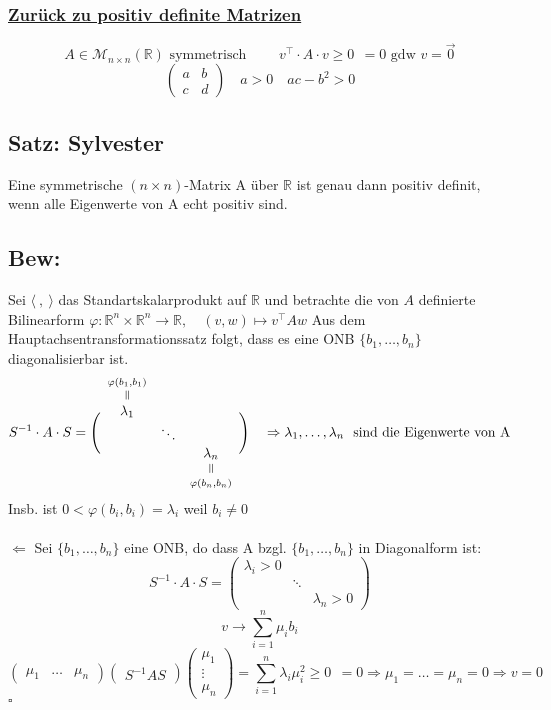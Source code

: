 \documentclass[titlepage,12pt,a4paper,ngerman]{report}
\newenvironment{bew}{\subsection{Bew:}}{\hfill$\square$}
\newcommand{\Bew}[1]{\begin{bew}#1\end{bew}}
\newcommand{\verteq}{\rotatebox{90}{$\,=$}}
\newcommand{\equalto}[2]{\underset{\scriptstyle\overset{\mkern4mu\verteq}{#2}}{#1}}
\newcommand{\equaltoup}[2]{\overset{\scriptstyle\underset{\mkern4mu\verteq}{#2}}{#1}}
\newcommand{\tx}[1]{\textrm{#1}}
\newcommand{\basis}[3]{\{#1_{#2}, \dots, #1_{#3}\}}
\newcommand{\ska}[2]{\langle #1 , #2 \rangle}
\begin{document}
\subsubsection*{\underline{Zurück zu positiv definite Matrizen}}

$$ A \in \mathcal{M}_{n \times n}(\mathbb{R}) \tx{ symmetrisch }\qquad v^\top \cdot A \cdot v \ge 0 \ \ = 0 \tx{ gdw } v = \vec{0} $$
$$\begin{pmatrix}
a & b \\
c & d
\end{pmatrix} \quad a > 0 \quad ac - b^2 > 0$$

\subsection{Satz: Sylvester}
Eine symmetrische $ (n \times n) $-Matrix A über $ \mathbb{R} $ ist genau dann positiv definit, wenn alle Eigenwerte von A echt positiv sind.

\Bew{\boxed{\Rightarrow} Sei $\ska{\ }{\ }$ das Standartskalarprodukt auf $\mathbb R$ und betrachte die von $A$ definierte Bilinearform $\varphi: \mathbb R^n \times \mathbb R^n \to \mathbb R, \quad (v,w) \mapsto v^\top A w$ Aus dem Hauptachsentransformationssatz folgt, dass es eine ONB $\basis{b}{1}{n}$ diagonalisierbar ist.
$$ S^{-1} \cdot A \cdot S = \Bigg(
\begin{array}{ccc}
\equaltoup{\lambda_1}{\varphi(b_1,b_1)} \\
& \ddots \\
& & \equalto{\lambda_n}{\varphi(b_n,b_n)}
\end{array} \Bigg) \quad \Rightarrow \lambda_1,\dots,\lambda_n \ \tx{ sind die Eigenwerte von A}$$
Insb. ist $ 0 < \varphi(b_i,b_i) = \lambda_i $ weil $ b_i \neq 0 $\\\\

\noindent $ \boxed{\Leftarrow} $
Sei $ \basis{b}{1}{n} $ eine ONB, do dass A bzgl. $ \basis{b}{1}{n} $ in Diagonalform ist:
$$S^{-1} \cdot A \cdot S = \begin{pmatrix}
\lambda_i > 0\\
& \ddots \\
& & \lambda_n >0
\end{pmatrix}$$
$$v \rightarrow \sum_{i=1}^{n} \mu_i b_i$$
$$\begin{pmatrix}
\mu_1 & \dots & \mu_n
\end{pmatrix} \begin{pmatrix}
S^{-1} A S
\end{pmatrix} \begin{pmatrix}
\mu_1\\
\vdots\\
\mu_n
\end{pmatrix} = \sum_{i=1}^{n} \lambda_i \mu_i^2 \ge 0  \ \ = 0 \Rightarrow \mu_1 = \dots = \mu_n = 0 \Rightarrow v = 0$$
}
\end{document}
